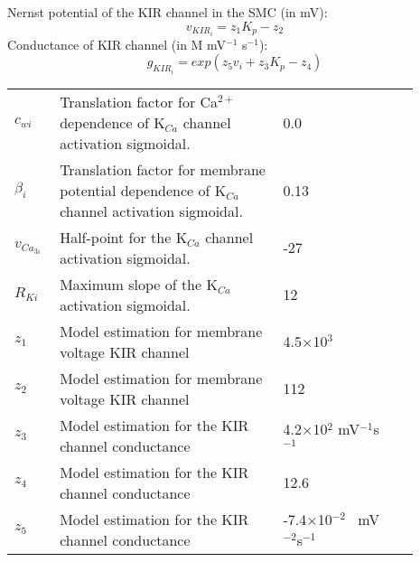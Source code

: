 \documentclass[fleqn]{report}
\numberwithin{equation}{section}
\numberwithin{equation}{section}
\begin{document}
	Nernst potential of the KIR channel in the SMC (in mV):
	\begin{equation}\label{eq:vKIR}
	v_{KIR_i} = z_1 K_p-z_2
	\end{equation}
	Conductance of KIR channel (in  \textmu M mV$^{-1}$ s$^{-1}$):
	\begin{equation}\label{eq:gKIR}
	g_{KIR_i} = exp(z_5v_i +z_3 K_p - z_4)
	\end{equation}
	\begin{table}[h!]
	\centering
	\begin{tabular}{ p{0.09\linewidth}  >{\footnotesize} p{0.5\linewidth}  >{\footnotesize} p{0.27\linewidth} >{\footnotesize} p{0.03\linewidth} }
	\hline
	$c_{wi}$      			& Translation factor for Ca$^{2+}$ dependence of K$_{Ca}$ channel activation sigmoidal.	& 0.0  \uM	&\cite{Koenigsberger2006} \\
	$\beta_{i}$     		& Translation factor for membrane potential dependence of K$_{Ca}$ channel activation sigmoidal.	& 0.13 \uMtwee& \cite{Koenigsberger2006} \\
	$v_{Ca_{3i}}$   		& Half-point for the K$_{Ca}$ channel activation sigmoidal.			& -27 \mV	&\cite{Koenigsberger2006} \\
	$R_{Ki}$      			& Maximum slope of the K$_{Ca}$ activation sigmoidal.				& 12 \mV	&\cite{Koenigsberger2006} \\
	  $ z_1 $	& Model estimation for membrane voltage KIR channel			  & 4.5$\times$10$^3$ \mVpuM & \citep{Filosa2006}\\
	  $ z_2 $	& Model estimation for membrane voltage KIR channel			  & 112	 \mV & \citep{Filosa2006}\\
	  $ z_3 $	& Model estimation for the KIR channel conductance			  & 4.2$\times$10$^2$ mV$^{-1}$s$^{-1}$ & \citep{Filosa2006}\\
	  $ z_4 $	& Model estimation for the KIR channel conductance			  & 12.6			 \uMpmVs & \citep{Filosa2006}\\
	  $ z_5 $	& Model estimation for the KIR channel conductance			  & -7.4$\times$10$^{-2}$		 \uM~mV$^{-2}$s$^{-1}$  & \citep{Filosa2006}\\
	  \hline
	\end{tabular}
	\label{tab:Addeq}
	\end{table}
\end{document}
